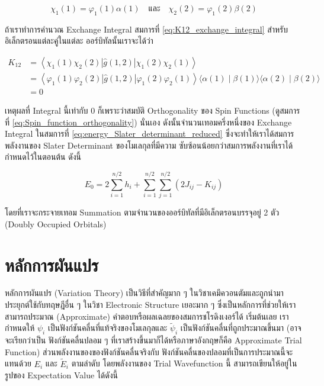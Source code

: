\begin{equation}
    \chi_1(1) = \varphi_1(1) \alpha(1) 
    \quad \text{และ} \quad 
    \chi_2(2) = \varphi_1(2) \beta(2)
\end{equation}

\noindent ถ้าเราทำการคำนวณ Exchange Integral สมการที่ \ref{eq:K12_exchange_integral} สำหรับอิเล็กตรอนแต่ละคู่ในแต่ละ%
ออร์บิทัลนั้นเราจะได้ว่า

\begin{equation}
    \begin{aligned}
        K_{12} 
        & =\left\langle\chi_1(1) \chi_2(2)|\hat{g}(1,2)| \chi_1(2) \chi_2(1)\right\rangle \\
        & =\left\langle\varphi_1(1) \varphi_2(2)|\hat{g}(1,2)| \varphi_1(2) \varphi_2(1)\right\rangle\langle\alpha(1) \mid \beta(1)\rangle\langle\alpha(2) \mid \beta(2)\rangle \\ 
        & = 0
    \end{aligned}
\end{equation}

\noindent เหตุผลที่ Integral นี้เท่ากับ 0 ก็เพราะว่าสมบัติ Orthogonality ของ Spin Functions 
(ดูสมการที่ \ref{eq:Spin_function_orthogonality}) นั่นเอง ดังนั้นจำนวนเทอมครึ่งหนึ่งของ Exchange Integral ในสมการที่ 
\ref{eq:energy_Slater_determinant_reduced} ซึ่งจะทำให้เราได้สมการพลังงานของ Slater Determinant ของโมเลกุลที่มีความ%
ซับซ้อนน้อยกว่าสมการพลังงานที่เราได้กำหนดไว้ในตอนต้น ดังนี้

\begin{equation}
    E_0 
    = 2 \sum_{i=1}^{n / 2} h_i 
        + \sum_{i=1}^{n / 2} \sum_{j=1}^{n / 2}\left(2 J_{i j} - K_{i j}\right)
\end{equation}

\noindent โดยที่เราจะกระจายเทอม Summation ตามจำนวนของออร์บิทัลที่มีอิเล็กตรอนบรรจุอยู่ 2 ตัว (Doubly Occupied Orbitals)

\section{หลักการผันแปร}

หลักการผันแปร (Variation Theory) เป็นวิธีที่สำคัญมาก ๆ ในวิชาเคมึควอนตัมและถูกนำมาประยุกต์ใช้กับทฤษฎีอื่น ๆ ในวิชา Electronic 
Structure เยอะมาก ๆ ซึ่งเป็นหลักการที่ช่วยให้เราสามารถประมาณ (Approximate) คำตอบหรือผลเฉลยของสมการชโรดิงเงอร์ได้ เริ่มต้นเลย%
เรากำหนดให้ $\psi_i$ เป็นฟังก์ชันคลื่นที่แท้จริงของโมเลกุลและ $\tilde{\psi}_i$ เป็นฟังก์ชันคลื่นที่ถูกประมาณขึ้นมา (อาจจะเรียกว่าเป็น%
ฟังก์ชันคลื่นปลอม ๆ ที่เราสร้างขึ้นมาก็ได้หรือภาษาอังกฤษก็คือ Approximate Trial Function) ส่วนพลังงานของของฟังก์ชันคลื่นจริงกับ%
ฟังก์ชันคลื่นของปลอมที่เป็นการประมาณนี้จะแทนด้วย $E_i$ และ $\tilde{E}_i$ ตามลำดับ โดยพลังงานของ Trial Wavefunction นี้%
สามารถเขียนให้อยู่ในรูปของ Expectation Value ได้ดังนี้

